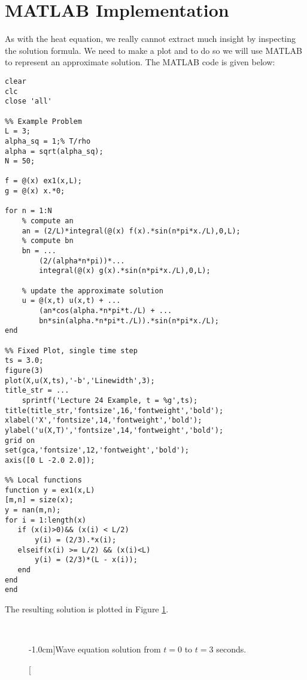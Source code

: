\section{MATLAB Implementation}
As with the heat equation, we really cannot extract much insight by inspecting the solution formula.  We need to make a plot and to do so we will use MATLAB to represent an approximate solution.
The MATLAB code is given below:
\begin{lstlisting}[name=lec24_ex, style=myMatlab]
clear
clc
close 'all'

%% Example Problem
L = 3;
alpha_sq = 1;% T/rho
alpha = sqrt(alpha_sq);
N = 50;

f = @(x) ex1(x,L);
g = @(x) x.*0;

for n = 1:N
    % compute an
    an = (2/L)*integral(@(x) f(x).*sin(n*pi*x./L),0,L);
    % compute bn
    bn = ...
        (2/(alpha*n*pi))*...
        integral(@(x) g(x).*sin(n*pi*x./L),0,L);
    
    % update the approximate solution
    u = @(x,t) u(x,t) + ...
        (an*cos(alpha.*n*pi*t./L) + ...
        bn*sin(alpha.*n*pi*t./L)).*sin(n*pi*x./L); 
end

%% Fixed Plot, single time step
ts = 3.0;
figure(3)
plot(X,u(X,ts),'-b','Linewidth',3);
title_str = ...
    sprintf('Lecture 24 Example, t = %g',ts);
title(title_str,'fontsize',16,'fontweight','bold');
xlabel('X','fontsize',14,'fontweight','bold');
ylabel('u(X,T)','fontsize',14,'fontweight','bold');
grid on
set(gca,'fontsize',12,'fontweight','bold');
axis([0 L -2.0 2.0]);

%% Local functions
function y = ex1(x,L)
[m,n] = size(x);
y = nan(m,n);
for i = 1:length(x)
   if (x(i)>0)&& (x(i) < L/2)
       y(i) = (2/3).*x(i);
   elseif(x(i) >= L/2) && (x(i)<L)
       y(i) = (2/3)*(L - x(i));
   end
end
end
\end{lstlisting}
The resulting solution is plotted in Figure \ref{fig:lec24-ex1}.
\begin{fullwidth}
\begin{figure}
\\
\label{fig:lec24-ex1}
\caption[][-1.0cm]{Wave equation solution from $t=0$ to $t=3$ seconds.}
\end{figure}
\end{fullwidth}

